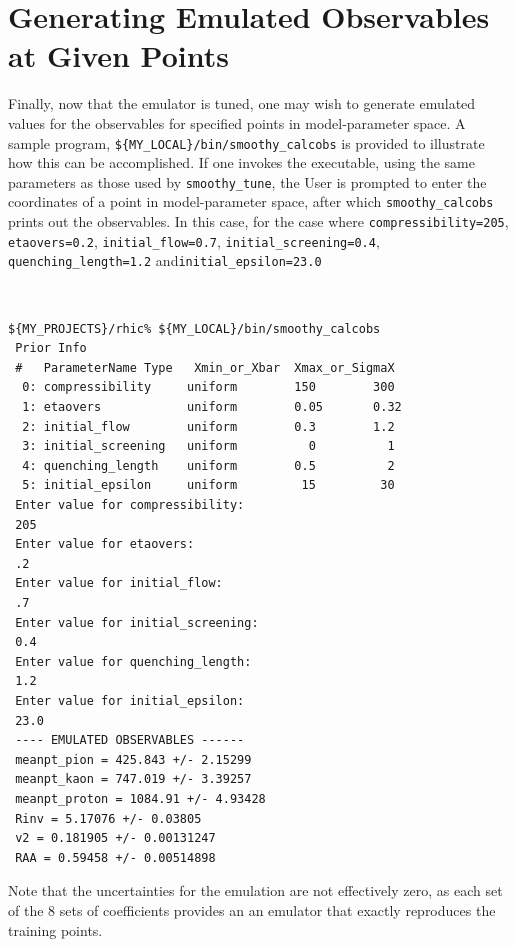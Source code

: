 \documentclass[UserManual.tex]{subfiles}
\begin{document}
\section{Generating Emulated Observables at Given Points}
Finally, now that the emulator is tuned, one may wish to generate emulated values for the observables for specified points in model-parameter space. A sample program, {\tt \$\{MY\_LOCAL\}/bin/smoothy\_calcobs} is provided to illustrate how this can be accomplished. If one invokes the executable, using the same parameters as those used by {\tt smoothy\_tune}, the User is prompted to enter the coordinates of a point in model-parameter space, after which {\tt smoothy\_calcobs} prints out the observables. In this case, for the case where {\tt compressibility=205}, {\tt etaovers=0.2}, {\tt initial\_flow=0.7}, {\tt initial\_screening=0.4}, {\tt quenching\_length=1.2} and{\tt initial\_epsilon=23.0}

{\tt
\begin{verbatim}
${MY_PROJECTS}/rhic% ${MY_LOCAL}/bin/smoothy_calcobs
 Prior Info
 #   ParameterName Type   Xmin_or_Xbar  Xmax_or_SigmaX
  0: compressibility     uniform        150        300
  1: etaovers            uniform        0.05       0.32
  2: initial_flow        uniform        0.3        1.2
  3: initial_screening   uniform          0          1
  4: quenching_length    uniform        0.5          2
  5: initial_epsilon     uniform         15         30
 Enter value for compressibility:
 205
 Enter value for etaovers:
 .2 
 Enter value for initial_flow:
 .7
 Enter value for initial_screening:
 0.4
 Enter value for quenching_length:
 1.2
 Enter value for initial_epsilon:
 23.0
 ---- EMULATED OBSERVABLES ------
 meanpt_pion = 425.843 +/- 2.15299
 meanpt_kaon = 747.019 +/- 3.39257
 meanpt_proton = 1084.91 +/- 4.93428
 Rinv = 5.17076 +/- 0.03805
 v2 = 0.181905 +/- 0.00131247
 RAA = 0.59458 +/- 0.00514898
\end{verbatim}
}
Note that the uncertainties for the emulation are not effectively zero, as each set of the 8 sets of coefficients provides an an emulator that exactly reproduces the training points.
\end{document}
